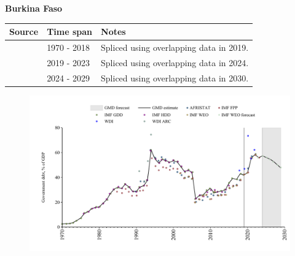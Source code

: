 \documentclass[12pt,a4paper,landscape]{article}
\begin{document}
\begin{adjustbox}{max totalsize={\paperwidth}{\paperheight},center}
\begin{minipage}[t][\textheight][t]{\textwidth}
\vspace*{0.5cm}
{}
\begin{center}
{\Large\bfseries Burkina Faso}
\end{center}
\vspace{0.5cm}
\begin{table}[H]
\centering
\small
\begin{tabular}{|l|l|l|}
\hline
\textbf{Source} & \textbf{Time span} & \textbf{Notes} \\
\hline
\rowcolor{white}\cite{IMF_GDD}& 1970 - 2018 &Spliced using overlapping data in 2019.\\
\rowcolor{lightgray}\cite{IMF_FPP}& 2019 - 2023 &Spliced using overlapping data in 2024.\\
\rowcolor{white}\cite{IMF_WEO_forecast}& 2024 - 2029 &Spliced using overlapping data in 2030.\\
\hline
\end{tabular}
\end{table}
\begin{figure}[H]
\centering
\includegraphics[width=\textwidth,height=0.6\textheight,keepaspectratio]{graphs/BFA_govdebt_GDP.pdf}
\end{figure}
\end{minipage}
\end{adjustbox}
\end{document}
